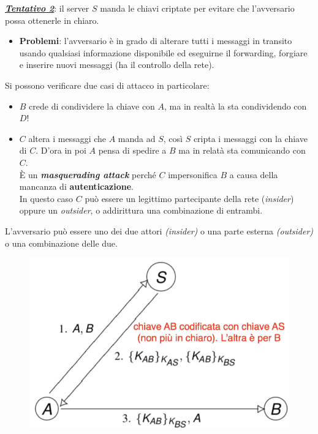 \documentclass[11pt, a4paper, twoside, italian]{report}
\theoremstyle{plain}
\begin{document}
\noindent
\textbf{\textit{\underline{Tentativo 2}}}: il server $S$ manda le chiavi criptate per evitare che l'avversario possa ottenerle in chiaro.	
	\begin{multicols}{2}
		\begin{itemize}
			\item \textbf{Problemi}: l'avversario è in grado di alterare tutti i messaggi in transito usando qualsiasi informazione disponibile ed eseguirne il forwarding, forgiare e inserire nuovi messaggi (ha il controllo della rete).
	\end{itemize}

	\noindent
	Si possono verificare due casi di attacco in particolare:
	\begin{itemize}
		\item $B$ crede di condividere la chiave con $A$, ma in realtà la sta condividendo con $D$!
		\item $C$ altera i messaggi che $A$ manda ad $S$, così $S$ cripta i messaggi con la chiave di $C$. D'ora in poi $A$ pensa di spedire a $B$ ma in relatà sta comunicando con $C$.\\
		È un \textit{\textbf{masquerading attack}} perché $C$ impersonifica $B$ a causa della mancanza di \textbf{autenticazione}.\\
		In questo caso $C$ può essere un legittimo partecipante della rete (\textit{insider}) oppure un \textit{outsider}, o addirittura una combinazione di entrambi.
	\end{itemize}
\noindent
L'avversario può essere uno dei due attori \textit{(insider)} o una parte esterna \textit{(outsider)} o una combinazione delle due.
\columnbreak
	\begin{figure}[H]
		\centering
		\includegraphics[scale=0.4]{attempt2}

\end{figure}
\end{multicols}
\end{document}

